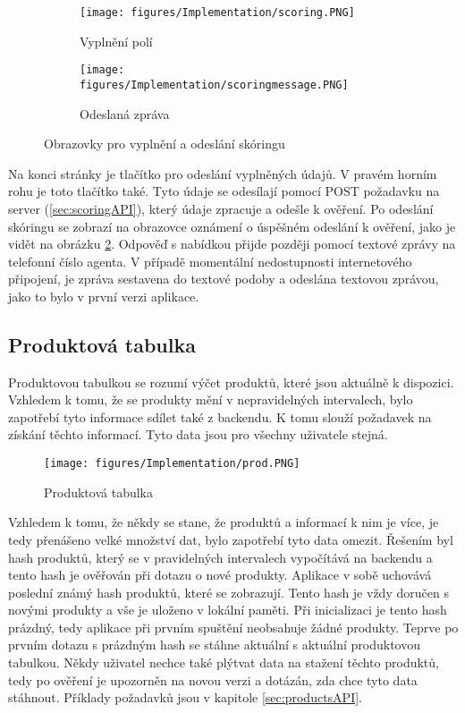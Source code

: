\documentclass[11pt,twoside,a4paper]{book}
\begin{document}
\begin{figure}[hbp]
	\centering
	\begin{subfigure}{.4\textwidth}
	  	\centering
	  	\texttt{[image: figures/Implementation/scoring.PNG]}
	  	\caption{Vyplnění polí}
	  	\label{fig:scoringscreensImplementa}
	\end{subfigure}
	\begin{subfigure}{.4\textwidth}
	  	\centering
		\texttt{[image: figures/Implementation/scoringmessage.PNG]}
	  	\caption{Odeslaná zpráva}
	  	\label{fig:scoringscreensImplementb}
	\end{subfigure}
\caption{Obrazovky pro vyplnění a odeslání skóringu}
\label{fig:scoringscreensImplement}
\end{figure}

Na konci stránky je tlačítko pro odeslání vyplněných údajů. V pravém horním rohu je toto tlačítko také. Tyto údaje se odesílají pomocí POST požadavku na server (\ref{sec:scoringAPI}), který údaje zpracuje a odešle k ověření. Po odeslání skóringu se zobrazí na obrazovce oznámení o úspěšném odeslání k ověření, jako je vidět na obrázku \ref{fig:scoringscreensImplementb}. Odpověď s nabídkou přijde později pomocí textové zprávy na telefonní číslo agenta. V případě momentální nedostupnosti internetového připojení, je zpráva sestavena do textové podoby a odeslána textovou zprávou, jako to bylo v první verzi aplikace.

\subsection{Produktová tabulka}
Produktovou tabulkou se rozumí výčet produktů, které jsou aktuálně k dispozici. Vzhledem k tomu, že se produkty mění v nepravidelných intervalech, bylo zapotřebí tyto informace sdílet také z backendu. K tomu slouží požadavek na získání těchto informací. Tyto data jsou pro všechny uživatele stejná. 

\begin{figure}[ht]
\begin{center}
\texttt{[image: figures/Implementation/prod.PNG]}
\caption{Produktová tabulka}
\label{fig:productscreens}
\end{center}
\end{figure}

Vzhledem k tomu, že někdy se stane, že produktů a informací k nim je více, je tedy přenášeno velké množství dat, bylo zapotřebí tyto data omezit. Řešením byl hash produktů, který se v pravidelných intervalech vypočítává na backendu a tento hash je ověřován při dotazu o nové produkty. Aplikace v sobě uchovává poslední známý hash produktů, které se zobrazují. Tento hash je vždy doručen s novými produkty a vše je uloženo v lokální paměti. Při inicializaci je tento hash prázdný, tedy aplikace při prvním spuštění neobsahuje žádné produkty. Teprve po prvním dotazu s prázdným hash se stáhne aktuální s aktuální produktovou tabulkou. Někdy uživatel nechce také plýtvat data na stažení těchto produktů, tedy po ověření je upozorněn na novou verzi a dotázán, zda chce tyto data stáhnout. Příklady požadavků jsou v kapitole \ref{sec:productsAPI}.
\end{document}
